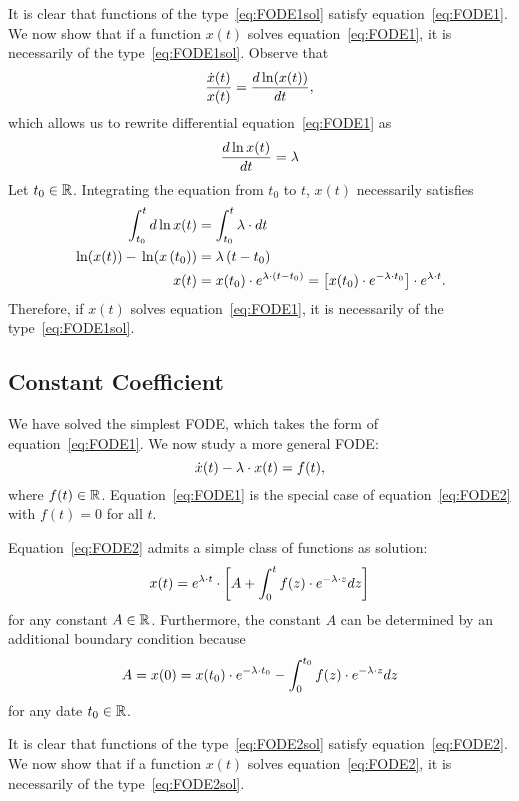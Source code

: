 \documentclass[letterpaper,12pt,leqno]{article}
\begin{document}
It is clear that functions of the type~\eqref{eq:FODE1sol} satisfy equation~\eqref{eq:FODE1}. We now show that if a function $x(t)$ solves equation~\eqref{eq:FODE1}, it is necessarily of the type~\eqref{eq:FODE1sol}.
Observe that
\begin{equation*}
\frac{\dot{x}(t)}{x(t)}=\od{\ln{x(t)}}{t},
\end{equation*}
which allows us to rewrite differential equation~\eqref{eq:FODE1} as 
\begin{equation*}
\frac{d\ln x(t)}{dt}=\l
\end{equation*}
Let $t_{0}\in\mathbb{R}$. Integrating the equation from $t_{0}$ to $t$, $x(t)$ necessarily satisfies
\begin{align*}
\int_{t_{0}}^{t} d\ln x(t)&=\int_{t_{0}}^{t} \l\cdot dt\\
\ln{x(t)} -\ln{ x\bp{t_{0}}}& =\l \bp{t-t_{0}}\\
x(t)&=x(t_{0})\cdot  e^{\l \cdot(t-t_{0})}=\bs{x(t_{0})\cdot e^{-\l \cdot t_{0}}}\cdot e^{\l \cdot t}.
\end{align*}
Therefore, if $x(t)$ solves equation~\eqref{eq:FODE1}, it is necessarily of the type~\eqref{eq:FODE1sol}.

 
\subsection{Constant Coefficient}

We have solved the simplest FODE, which takes the form of equation~\eqref{eq:FODE1}. We now study a more general FODE: 
\begin{equation}
\dot{x}(t)-\lambda \cdot x(t) =f(t),\label{eq:FODE2}
\end{equation}
where $f(t)\in \mathbb{R}$. Equation~\eqref{eq:FODE1} is the special case of equation~\eqref{eq:FODE2} with $f(t)=0$ for all $t$.

Equation~\eqref{eq:FODE2} admits a simple class of functions as solution:
\begin{equation}
x(t)=e^{\lambda \cdot t} \cdot \left[ A+\int_{0}^{t}f(z) \cdot e^{-\lambda \cdot z} dz \right] \label{eq:FODE2sol}
\end{equation}
for any constant $A\in \mathbb{R}$. Furthermore, the constant $A$ can be determined by an additional boundary condition because
\[A=x(0)=x(t_{0})\cdot e^{-\lambda \cdot t_{0}}-\int_{0}^{t_{0}}f(z) \cdot e^{-\lambda \cdot z} dz\]
for any date $t_{0}\in \mathbb{R}$.

It is clear that functions of the type~\eqref{eq:FODE2sol} satisfy equation~\eqref{eq:FODE2}. We now show that if a function $x(t)$ solves equation~\eqref{eq:FODE2}, it is necessarily of the type~\eqref{eq:FODE2sol}.
\end{document}
